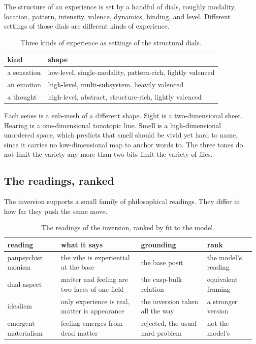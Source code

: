 The structure of an experience is set by a handful of dials, roughly modality, location, pattern, intensity, valence, dynamics, binding, and level. Different settings of those dials are different kinds of experience.

\begin{table}[ht]
\centering
\begin{tabular}{@{}ll@{}}
\toprule
kind & shape \\
\midrule
a sensation & low-level, single-modality, pattern-rich, lightly valenced \\
an emotion & high-level, multi-subsystem, heavily valenced \\
a thought & high-level, abstract, structure-rich, lightly valenced \\
\bottomrule
\end{tabular}
\caption{Three kinds of experience as settings of the structural dials.}
\label{tab:experience-kinds}
\end{table}

Each sense is a sub-mesh of a different shape. Sight is a two-dimensional sheet. Hearing is a one-dimensional tonotopic line. Smell is a high-dimensional unordered space, which predicts that smell should be vivid yet hard to name, since it carries no low-dimensional map to anchor words to. The three tones do not limit the variety any more than two bits limit the variety of files.

\subsection{The readings, ranked}

The inversion supports a small family of philosophical readings. They differ in how far they push the same move.

\begin{table}[ht]
\centering
\begin{tabular}{@{}llll@{}}
\toprule
reading & what it says & grounding & rank \\
\midrule
panpsychist monism & the vibe is experiential at the base & the base posit & the model's reading \\
dual-aspect & matter and feeling are two faces of one field & the cusp-bulk relation & equivalent framing \\
idealism & only experience is real, matter is appearance & the inversion taken all the way & a stronger version \\
emergent materialism & feeling emerges from dead matter & rejected, the usual hard problem & not the model's \\
\bottomrule
\end{tabular}
\caption{The readings of the inversion, ranked by fit to the model.}
\label{tab:readings}
\end{table}

